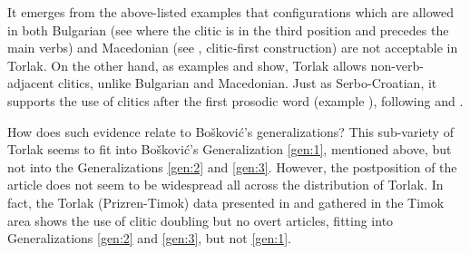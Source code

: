 \documentclass[output=paper,
colorlinks,
citecolor=brown,
newtxmath
]{langscibook}
\begin{document}

\z


\z


\z


\z

\noindent It emerges from the above-listed examples that configurations which are allowed in both Bulgarian (see  where the clitic is in the third position and precedes the main verbs) and Macedonian (see , clitic-first construction) are not acceptable in Torlak. On the other hand, as examples  and  show, Torlak allows non-verb-adjacent clitics, unlike Bulgarian and Macedonian. Just as Serbo-Croatian, it supports the use of clitics after the first prosodic word (example ), following \citet{Boskovic2001} and \citet{Radanovic-Kocic1988}.

How does such evidence relate to Bošković’s generalizations? This sub-variety of Torlak seems to fit into Bošković’s Generalization \ref{gen:1}, mentioned above, but not into the Generalizations \ref{gen:2} and \ref{gen:3}. However, the postposition of the article does not seem to be widespread all across the distribution of Torlak. In fact, the Torlak (Prizren-Timok) data presented in \citet{Runic2014} and gathered in the Timok area shows the use of clitic doubling but no overt articles, fitting into Generalizations \ref{gen:2} and \ref{gen:3}, but not \ref{gen:1}.
%
%
\end{document}
